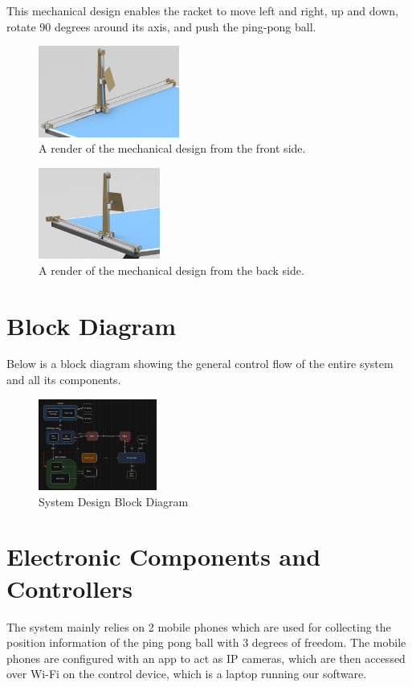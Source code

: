 This mechanical design enables the racket to move left and right, up and down,
rotate 90 degrees around its axis, and push the ping-pong ball.

\begin{figure}[h] 
	\centering \includegraphics[height=3cm]{./images/frontrender.jpg}
	\caption{A render of the mechanical design from the front side.}
\end{figure}
\begin{figure}[h] 
	\centering \includegraphics[height=3cm]{./images/backrender.jpg}
	\caption{A render of the mechanical design from the back side.}
\end{figure}



\section{Block Diagram}
Below is a block diagram showing the general control flow of the entire system and all its components.

\begin{figure}[h]
	\centering\includegraphics[height=3cm]{./images/blockdiagram}
	\caption{System Design Block Diagram}
\end{figure}

\section{Electronic Components and Controllers}
The system mainly relies on 2 mobile phones which are used for collecting the position information of the ping pong ball with 3 degrees of freedom. The mobile phones are configured with an app to act as IP cameras, which are then accessed over Wi-Fi on the control device, which is a laptop running our software.

